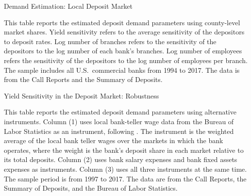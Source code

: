 \documentclass[12pt]{article}
\begin{document}
\clearpage\newpage
	\begin{table}[h]
		\caption{Demand Estimation: Local Deposit Market\label{tab:Demand_Local}}
		\vspace{5mm}
		
		\vspace{5mm}
		
		\small{This table reports the estimated deposit demand parameters using county-level market shares. Yield sensitivity refers to the average sensitivity of the depositors to deposit rates. Log number of branches refers to the sensitivity of the depositors to the log number of each bank's branches. Log number of employees refers the sensitivity of the depositors to the log number of employees per branch. The sample includes all U.S.\ commercial banks from 1994 to 2017. The data is from the Call Reports and the Summary of Deposits.}
	\end{table}

 \begin{table}[h]
 	\caption{Yield Sensitivity in the Deposit Market: Robustness \label{tab:demand_estimation_wage_deposit_1997_2017}}
 	\vspace{5mm}
 	
 	\vspace{5mm}
 	
 	\small{This table reports the estimated deposit demand parameters using alternative instruments. Column (1) uses local bank-teller wage data from the Bureau of Labor Statistics as an instrument, following \cite{Dick2008}. The instrument is   the weighted average of the local bank teller wages over the markets in which the bank operates, where the weight is the bank's deposit share in each market relative to its total deposits. Column (2) uses bank salary expenses and bank fixed assets expenses as instruments. Column (3) uses all  three instruments at the same time.  The sample period is from 1997 to 2017. The data are from the Call Reports, the Summary of Deposits, and the Bureau of Labor Statistics.}
 \end{table}
 
 
 
\end{document}
